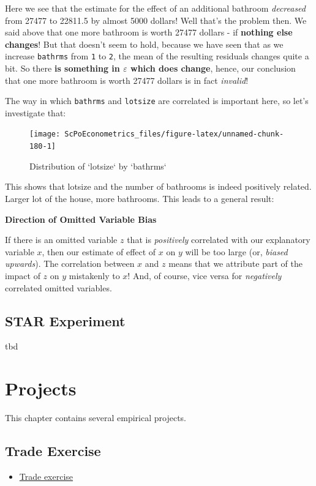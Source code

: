 \documentclass[]{book}
\providecommand{\tightlist}{%
  \setlength{\itemsep}{0pt}\setlength{\parskip}{0pt}}
\newenvironment{note}{\begin{tcolorbox}[colback=blue!5!white,colframe=blue!75!black]}{\end{tcolorbox}}
\begin{document}
Here we see that the estimate for the effect of an additional bathroom
\emph{decreased} from 27477 to 22811.5 by almost 5000 dollars! Well
that's the problem then. We said above that one more bathroom is worth
27477 dollars - if \textbf{nothing else changes}! But that doesn't seem
to hold, because we have seen that as we increase \texttt{bathrms} from
\texttt{1} to \texttt{2}, the mean of the resulting residuals changes
quite a bit. So there \textbf{is something in \(\varepsilon\) which does
change}, hence, our conclusion that one more bathroom is worth 27477
dollars is in fact \emph{invalid}!

The way in which \texttt{bathrms} and \texttt{lotsize} are correlated is
important here, so let's investigate that:

\begin{figure}

{\centering \texttt{[image: ScPoEconometrics\_files/figure-latex/unnamed-chunk-180-1]} 

}

\caption{Distribution of `lotsize` by `bathrms`}\label{fig:unnamed-chunk-180}
\end{figure}

This shows that lotsize and the number of bathrooms is indeed positively
related. Larger lot of the house, more bathrooms. This leads to a
general result:

\begin{note}
\textbf{Direction of Omitted Variable Bias}

If there is an omitted variable \(z\) that is \emph{positively}
correlated with our explanatory variable \(x\), then our estimate of
effect of \(x\) on \(y\) will be too large (or, \emph{biased upwards}).
The correlation between \(x\) and \(z\) means that we attribute part of
the impact of \(z\) on \(y\) mistakenly to \(x\)! And, of course, vice
versa for \emph{negatively} correlated omitted variables.
\end{note}

\section{STAR Experiment}\label{star-experiment}

tbd

\chapter{Projects}\label{projects}

This chapter contains several empirical projects.

\section{Trade Exercise}\label{trade-exercise}

\begin{itemize}
\tightlist
\item
  \href{images/trade.html}{Trade exercise}
\end{itemize}


\end{document}
